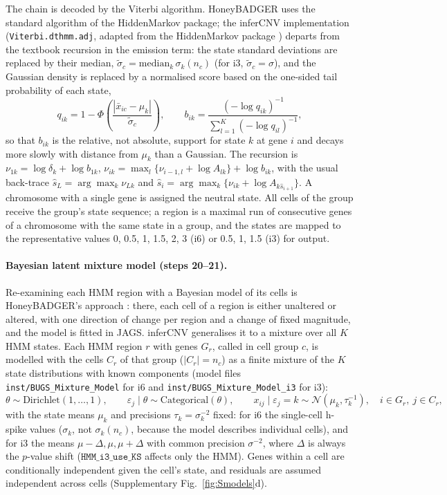 The chain is decoded by the Viterbi algorithm. HoneyBADGER uses the standard algorithm of the HiddenMarkov package; the inferCNV implementation (\texttt{Viterbi.dthmm.adj}, adapted from the HiddenMarkov package \citep{hiddenmarkov}) departs from the textbook recursion in the emission term: the state standard deviations are replaced by their median, $\tilde\sigma_c = \mathrm{median}_k\,\sigma_k(n_c)$ (for i3, $\tilde\sigma_c=\sigma$), and the Gaussian density is replaced by a normalised score based on the one-sided tail probability of each state,
\begin{equation}
q_{ik} = 1-\Phi\!\left(\frac{|\bar x_{ic}-\mu_k|}{\tilde\sigma_c}\right),\qquad
b_{ik} = \frac{(-\log q_{ik})^{-1}}{\sum_{l=1}^{K}(-\log q_{il})^{-1}},
\label{eq:emission}
\end{equation}
so that $b_{ik}$ is the relative, not absolute, support for state $k$ at gene $i$ and decays more slowly with distance from $\mu_k$ than a Gaussian. The recursion is $\nu_{1k} = \log\delta_k + \log b_{1k}$, $\nu_{ik} = \max_l\{\nu_{i-1,l} + \log A_{lk}\} + \log b_{ik}$, with the usual back-trace $\hat s_L=\arg\max_k \nu_{Lk}$ and $\hat s_i = \arg\max_k\{\nu_{ik}+\log A_{k\hat s_{i+1}}\}$. A chromosome with a single gene is assigned the neutral state. All cells of the group receive the group's state sequence; a region is a maximal run of consecutive genes of a chromosome with the same state in a group, and the states are mapped to the representative values 0, 0.5, 1, 1.5, 2, 3 (i6) or 0.5, 1, 1.5 (i3) for output.

\paragraph{Bayesian latent mixture model (steps 20--21).}
Re-examining each HMM region with a Bayesian model of its cells is HoneyBADGER's approach \citep{fan2018}: there, each cell of a region is either unaltered or altered, with one direction of change per region and a change of fixed magnitude, and the model is fitted in JAGS. inferCNV generalises it to a mixture over all $K$ HMM states. Each HMM region $r$ with genes $G_r$, called in cell group $c$, is modelled with the cells $C_r$ of that group ($|C_r|=n_c$) as a finite mixture of the $K$ state distributions with known components (model files \texttt{inst/BUGS\_Mixture\_Model} for i6 and \texttt{inst/BUGS\_Mixture\_Model\_i3} for i3):
\begin{equation}
\theta \sim \mathrm{Dirichlet}(1,\dots,1),\qquad
\varepsilon_j \mid \theta \sim \mathrm{Categorical}(\theta),\qquad
x_{ij}\mid \varepsilon_j=k \sim \mathcal N(\mu_k, \tau_k^{-1}),\quad i\in G_r,\ j\in C_r,
\end{equation}
with the state means $\mu_k$ and precisions $\tau_k=\sigma_k^{-2}$ fixed: for i6 the single-cell h-spike values ($\sigma_k$, not $\sigma_k(n_c)$, because the model describes individual cells), and for i3 the means $\mu-\Delta,\mu,\mu+\Delta$ with common precision $\sigma^{-2}$, where $\Delta$ is always the $p$-value shift ($\texttt{HMM\_i3\_use\_KS}$ affects only the HMM). Genes within a cell are conditionally independent given the cell's state, and residuals are assumed independent across cells (Supplementary Fig.~\ref{fig:Smodels}d).

